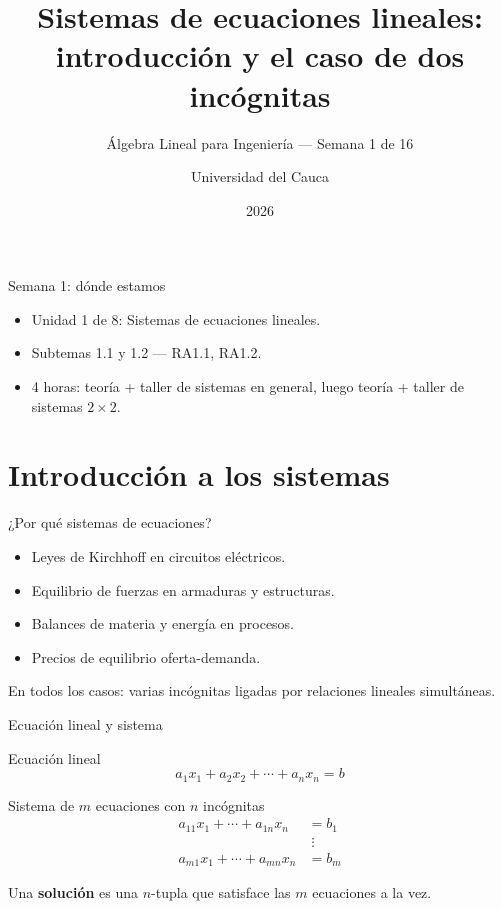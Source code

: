 \documentclass[11pt]{beamer}
\title[Semana 1: Sistemas de ecuaciones]{Sistemas de ecuaciones lineales: introducción y el
  caso de dos incógnitas}
\subtitle{Álgebra Lineal para Ingeniería --- Semana 1 de 16}
\author{Universidad del Cauca}
\date{2026}
\begin{document}
\begin{frame}
  \titlepage
\end{frame}

\begin{frame}{Semana 1: dónde estamos}
  \begin{itemize}
    \item Unidad 1 de 8: Sistemas de ecuaciones lineales.
    \item Subtemas 1.1 y 1.2 --- RA1.1, RA1.2.
    \item 4 horas: teoría + taller de sistemas en general, luego teoría + taller de sistemas
          $2\times 2$.
  \end{itemize}
  \tableofcontents
\end{frame}

\section{Introducción a los sistemas}

\begin{frame}{¿Por qué sistemas de ecuaciones?}
  \begin{itemize}
    \item Leyes de Kirchhoff en circuitos eléctricos.
    \item Equilibrio de fuerzas en armaduras y estructuras.
    \item Balances de materia y energía en procesos.
    \item Precios de equilibrio oferta-demanda.
  \end{itemize}
  \vfill
  En todos los casos: varias incógnitas ligadas por relaciones lineales simultáneas.
\end{frame}

\begin{frame}{Ecuación lineal y sistema}
  \begin{block}{Ecuación lineal}
    \[
      a_1x_1+a_2x_2+\cdots+a_nx_n = b
    \]
  \end{block}
  \begin{block}{Sistema de $m$ ecuaciones con $n$ incógnitas}
    \[
    \begin{aligned}
      a_{11}x_1+\cdots+a_{1n}x_n &= b_1 \\
      &\;\vdots \\
      a_{m1}x_1+\cdots+a_{mn}x_n &= b_m
    \end{aligned}
    \]
  \end{block}
  Una \textbf{solución} es una $n$-tupla que satisface las $m$ ecuaciones a la vez.
\end{frame}
\end{document}
